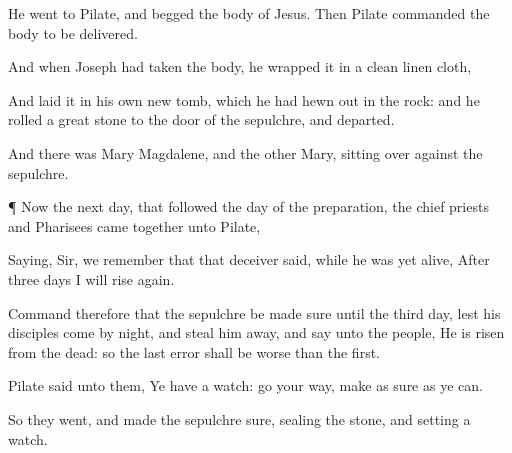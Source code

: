 {He went
to
Pilate, and
begged the
body of
Jesus.
Then
Pilate
commanded the
body to be
delivered.

And
when
Joseph had
taken the
body, he
wrapped
it
in a
clean linen
cloth,

And
laid
it
in his
own
new
tomb,
which he had hewn
out
in the
rock:
and he
rolled
a
great
stone to the
door of the
sepulchre, and
departed.

And
there
was
Mary
Magdalene,
and the
other
Mary,
sitting over
against the
sepulchre.


\par }{\PP {}¶
Now the next
day,
that
followed the day of the
preparation, the chief
priests
and
Pharisees came
together
unto
Pilate,

Saying,
Sir, we
remember
that
that
deceiver
said, while he
was
yet
alive,
After
three
days I will rise
again.

Command
therefore
that the
sepulchre be made
sure
until
the
third
day,
lest
his
disciples
come by
night, and
steal him
away,
and
say unto the
people, He is
risen
from the
dead:
so the
last
error shall
be worse
than the
first.

Pilate
said unto
them, Ye
have a
watch: go your
way,
make
{} as
sure
as ye
can.

So
they
went, and
made the
sepulchre
sure,
sealing the
stone, and
setting a
watch.




\par }

